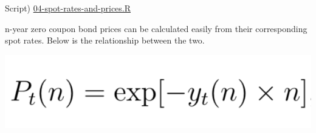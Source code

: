 \documentclass[]{book}
\theoremstyle{definition}
\theoremstyle{definition}
\theoremstyle{definition}
\theoremstyle{remark}
\begin{document}
Script)
\href{./R/04-spot-rates-and-prices.R}{04-spot-rates-and-prices.R}

n-year zero coupon bond prices can be calculated easily from their
corresponding spot rates. Below is the relationship between the two.

\begin{center}\includegraphics[width=8.08in]{images/zero-prices} \end{center}


\end{document}
